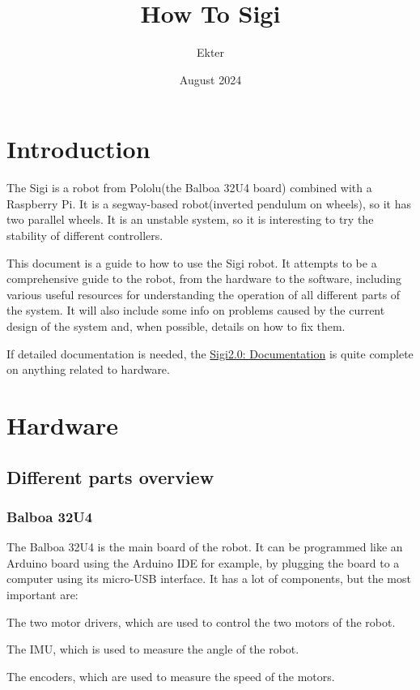 \documentclass{article}
\begin{document}
\title{How To Sigi}
\author{Ekter}
\date{August 2024}
\maketitle


\section{Introduction}

The Sigi is a robot from Pololu(the Balboa 32U4 board) combined with a Raspberry Pi.
It is a segway-based robot(inverted pendulum on wheels), so it has two parallel wheels.
It is an unstable system, so it is interesting to try the stability of different controllers.

This document is a guide to how to use the Sigi robot.
It attempts to be a comprehensive guide to the robot, from the hardware to the software,
including various useful resources for understanding the operation of all different parts of the system.
It will also include some info on problems caused by the current design of the system and,
when possible, details on how to fix them.

If detailed documentation is needed, the \href{file://Sigi_documentation_part1.pdf}{Sigi2.0: Documentation}
is quite complete on anything related to hardware.


\section{Hardware}

\subsection{Different parts overview}
\subsubsection{Balboa 32U4}
The Balboa 32U4 is the main board of the robot.
It can be programmed like an Arduino board using the Arduino IDE for example, by plugging the board to a
computer using its micro-USB interface.
It has a lot of components, but the most important are:
\begin{list}{-}{}
    \item The two motor drivers, which are used to control the two motors of the robot.

    \item The IMU, which is used to measure the angle of the robot.

    \item The encoders, which are used to measure the speed of the motors.
\end{list}
\end{document}
